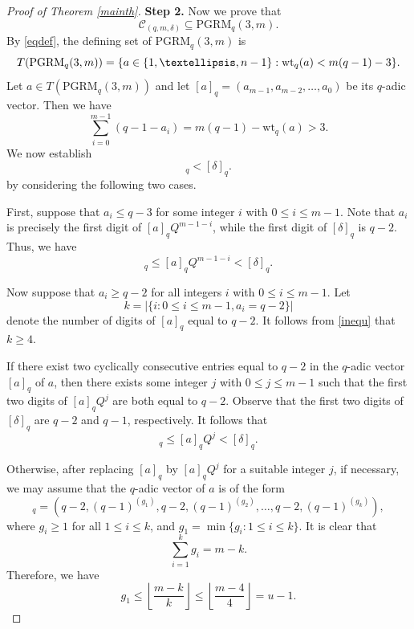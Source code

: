 \documentclass[10pt,a4paper]{amsart}
\newcommand{\cl}{\operatorname{cl}}
\begin{document}
\begin{proof}[Proof of Theorem \ref{mainth}]
{\bf Step 2.} Now we prove that
\begin{equation}\label{contain}
\mathcal{C}_{(q,m,\delta)}
\subseteq
\mathrm{PGRM}_q(3,m).
\end{equation}
By \eqref{eqdef},  the defining set of $\mathrm{PGRM}_q(3,m)$  is 
\begin{equation}\notag
T(\mathrm{PGRM}_q(3,m)) = \{ a \in \{ 1, \dots, n-1\} : \mathrm{wt}_q(a) < m(q-1)-3 \}.
\end{equation}
Let $a \in T(\mathrm{PGRM}_q(3,m))$ and let $[a]_q = (a_{m-1}, a_{m-2}, \dots, a_0)$ be its $q$-adic vector. Then we have
\begin{equation}\label{inequ}
    \sum_{i=0}^{m-1} (q - 1 - a_i) = m(q-1) - \mathrm{wt}_q(a) > 3.
\end{equation}
We now establish
\begin{equation*}
   [\cl(a)]_q < [\delta]_q.
\end{equation*}
by considering the following two cases.

First, suppose that $a_i \le q - 3$ for some integer $i$ with $0\leq i \leq  m-1$. Note that $a_i$ is precisely the first digit of $[a]_q Q^{m-1-i}$, while the first digit of $[\delta]_q$ is $q-2$. Thus, we have
\begin{equation*}
    [\cl(a)]_q \le [a]_q Q^{m-1-i} < [\delta]_q.
\end{equation*}

Now suppose that $a_i \ge q - 2$ for all integers $i$ with $0\leq i\leq m-1 $. Let
\begin{equation*}
k = |\{i : 0\leq i\leq m-1, a_i = q-2\}|
\end{equation*}
denote the number of digits of $[a]_q$  equal to $q-2$. It follows from \eqref{inequ} that $k \ge 4$.

If there exist two cyclically consecutive entries equal to $q-2$ in the $q$-adic vector $[a]_q$ of $a$, then there exists some integer $j$ with $0\leq j \leq   m-1$ such that the first two digits of $[a]_q Q^j$ are both equal to $q-2$. Observe that the first two digits of $[\delta]_q$ are $q-2$ and $q-1$, respectively.
It follows  that
\begin{equation*}
    [\mathrm{cl}(a)]_q \le [a]_q Q^j < [\delta]_q.
\end{equation*}

Otherwise, after replacing $[a]_q$ by $[a]_qQ^j$ for a suitable integer
$j$, if necessary, we may assume that the $q$-adic vector of $a$ is of the form
\begin{equation*}
    [a]_q = \left( q-2, (q-1)^{(g_1)}, q-2, (q-1)^{(g_2)}, \dots, q-2, (q-1)^{(g_k)} \right),
\end{equation*}
where $g_i \ge 1$ for all $1 \le i \le k$, and $g_1 = \min \{g_i : 1 \le i \le k\}$. It is clear that
\begin{equation*}
    \sum_{i=1}^k g_i = m - k.
\end{equation*}
Therefore, we have
\begin{equation*}
    g_1  \le \left\lfloor \frac{m-k}{k} \right\rfloor \le \left\lfloor \frac{m-4}{4} \right\rfloor = u - 1.
\end{equation*}


\end{proof}
\end{document}
